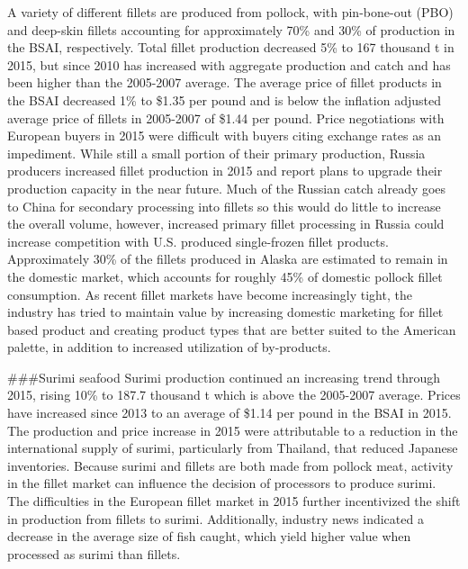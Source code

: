 A variety of different fillets are produced from pollock, with
pin-bone-out (PBO) and deep-skin fillets accounting for approximately
70\% and 30\% of production in the BSAI, respectively. Total fillet
production decreased 5\% to 167 thousand t in 2015, but since 2010 has
increased with aggregate production and catch and has been higher than
the 2005-2007 average. The average price of fillet products in the BSAI
decreased 1\% to \$1.35 per pound and is below the inflation adjusted
average price of fillets in 2005-2007 of \$1.44 per pound. Price
negotiations with European buyers in 2015 were difficult with buyers
citing exchange rates as an impediment. While still a small portion of
their primary production, Russia producers increased fillet production
in 2015 and report plans to upgrade their production capacity in the
near future. Much of the Russian catch already goes to China for
secondary processing into fillets so this would do little to increase
the overall volume, however, increased primary fillet processing in
Russia could increase competition with U.S. produced single-frozen
fillet products. Approximately 30\% of the fillets produced in Alaska
are estimated to remain in the domestic market, which accounts for
roughly 45\% of domestic pollock fillet consumption. As recent fillet
markets have become increasingly tight, the industry has tried to
maintain value by increasing domestic marketing for fillet based product
and creating product types that are better suited to the American
palette, in addition to increased utilization of by-products.

\#\#\#Surimi seafood Surimi production continued an increasing trend
through 2015, rising 10\% to 187.7 thousand t which is above the
2005-2007 average. Prices have increased since 2013 to an average of
\$1.14 per pound in the BSAI in 2015. The production and price increase
in 2015 were attributable to a reduction in the international supply of
surimi, particularly from Thailand, that reduced Japanese inventories.
Because surimi and fillets are both made from pollock meat, activity in
the fillet market can influence the decision of processors to produce
surimi. The difficulties in the European fillet market in 2015 further
incentivized the shift in production from fillets to surimi.
Additionally, industry news indicated a decrease in the average size of
fish caught, which yield higher value when processed as surimi than
fillets.

